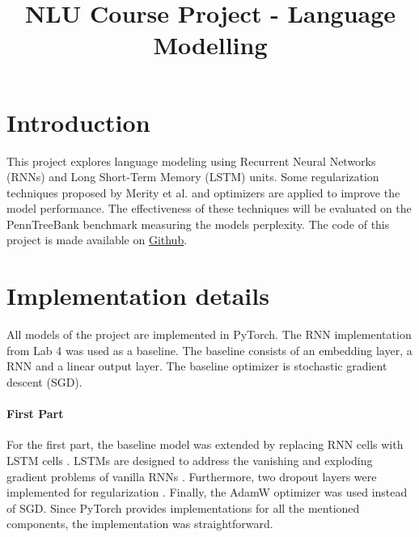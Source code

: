 \documentclass[a4paper]{article}
\title{NLU Course Project - Language Modelling}
\begin{document}
\maketitle


\section{Introduction}
This project explores language modeling using Recurrent Neural Networks (RNNs) and Long Short-Term Memory (LSTM) units. Some regularization techniques proposed by Merity et al. \cite{merity2017regularizing} and optimizers are applied to improve the model performance. The effectiveness of these techniques will be evaluated on the PennTreeBank benchmark measuring the models perplexity. The code of this project is made available on \href{https://github.com/chrisdalvit/nlu-assignment}{Github}.

\section{Implementation details}
\label{sec:implementation}
All models of the project are implemented in PyTorch. The RNN implementation from Lab 4 was used as a baseline. The baseline consists of an embedding layer, a RNN and a linear output layer. The baseline optimizer is stochastic gradient descent (SGD). 
\paragraph*{First Part}
For the first part, the baseline model was extended by replacing RNN cells with LSTM cells \cite{hochreiter1997long}. LSTMs are designed to address the vanishing and exploding gradient problems of vanilla RNNs \cite{sak2014long}. Furthermore, two dropout layers were implemented for regularization \cite{srivastava2014dropout}. Finally, the AdamW \cite{loshchilov2017decoupled} optimizer was used instead of SGD. Since PyTorch provides implementations for all the mentioned components, the implementation was straightforward.
\end{document}
